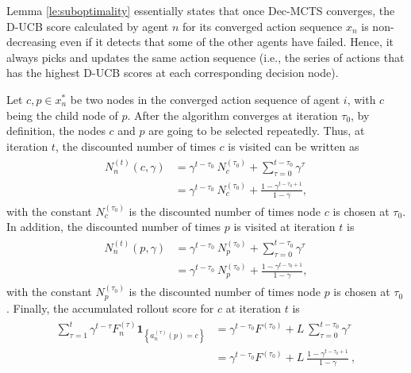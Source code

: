 Lemma \ref{le:suboptimality} essentially states that once Dec-MCTS converges, the D-UCB score calculated by agent $n$ for its converged action sequence $x_n$ is non-decreasing even if it detects that some of the other agents have failed. Hence, it always picks and updates the same action sequence (i.e., the series of actions that has the highest D-UCB scores at each corresponding decision node).

Let $c, p \in x^*_n$ be two nodes in the converged action sequence of agent $i$, with $c$ being the child node of $p$. After the algorithm converges at iteration $\tau_0$, by definition, the nodes $c$ and $p$ are going to be selected repeatedly. Thus, at iteration $t$, the discounted number of times $c$ is visited can be written as
\begin{eqnarray} \label{N_n_c}
\begin{aligned}
    N^{(t)}_n(c,\gamma) &= \gamma^{t-\tau_0}\ N^{(\tau_0)}_c + \sum_{\tau=0}^{t-\tau_0} \gamma^{\tau}  \\ 
    &= \gamma^{t-\tau_0}\ N^{(\tau_0)}_c + \frac{1-\gamma^{t-\tau_0+1}}{1-\gamma}, 
\end{aligned}
\end{eqnarray}
with the constant $N^{(\tau_0)}_c$ is the discounted number of times node $c$ is chosen at $\tau_0$. In addition, the discounted number of times $p$ is visited at iteration $t$ is
\begin{eqnarray} \label{N_n_p}
\begin{aligned}
    N^{(t)}_n(p,\gamma) &= \gamma^{t-\tau_0}\ N^{(\tau_0)}_p + \sum_{\tau=0}^{t-\tau_0} \gamma^{\tau} \\ 
    &= \gamma^{t-\tau_0}\ N^{(\tau_0)}_p + \frac{1-\gamma^{t-\tau_0+1}}{1-\gamma}, 
\end{aligned}
\end{eqnarray}
with the constant $N^{(\tau_0)}_p$ is the discounted number of times node $p$ is chosen at $\tau_0$. Finally, the accumulated rollout score for $c$ at iteration $t$ is
\begin{eqnarray} \label{F_n_c}
\begin{aligned}
    \sum_{\tau=1}^t \gamma^{t-\tau} F^{(\tau)}_n \textbf{1}_{ \left\{ a_n^{(\tau)}(p)=c \right\}} &= \gamma^{t-\tau_0} F^{(\tau_0)}  + L\ \sum_{\tau=0}^{t-\tau_0} \gamma^{\tau} \\ 
    &= \gamma^{t-\tau_0} F^{(\tau_0)}  + L\ \frac{1-\gamma^{t-\tau_0+1}}{1-\gamma}\ ,
\end{aligned}
\end{eqnarray}

